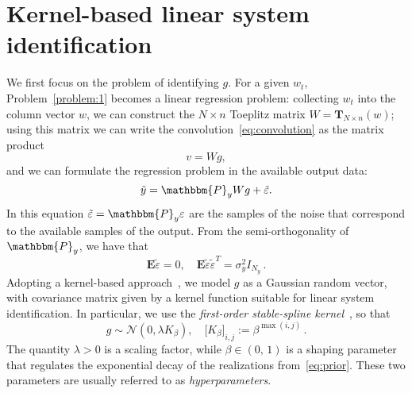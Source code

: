\documentclass[10pt]{article}
\renewcommand{\P}{\mathbbm{P}}
\newcommand{\T}{\mathbf{T}}
\newcommand{\E}{\mathbf{E}}
\begin{document}
\section{Kernel-based linear system identification}\label{sec:sysid}
We first focus on the problem of identifying $g$. For a given $w_t$,
Problem~\ref{problem:1} becomes a linear regression problem: collecting
$w_t$ into the column vector $w$, we can construct the $N\times n$
Toeplitz matrix $W = \T_{N\times n}(w)$; using this matrix we can write the
convolution~\eqref{eq:convolution} as the matrix product
\begin{equation}
  v = Wg,
\end{equation}
and we can formulate the regression problem in the available output data:
\begin{equation}\label{eq:regression}
  \tilde y = \P_y Wg + \tilde \varepsilon.
\end{equation}
In this equation $\tilde \varepsilon = \P_y\varepsilon$ are the samples of the
noise that correspond to the available samples of the output. From the
semi-orthogonality of $\P_y$, we have that
\begin{equation}
  \E \tilde \varepsilon =  0, \quad \E{\tilde \varepsilon \tilde \varepsilon^T}
  =
  \sigma_y^2 I_{N_y} \,.
\end{equation}
Adopting a kernel-based approach~\cite{pillonetto2014kernel}, we model $g$ as a
Gaussian random vector, with covariance matrix given by a kernel function
suitable for linear system identification. In particular, we use the
\emph{first-order stable-spline kernel}~\cite{pillonetto2010new}, so that
\begin{equation}\label{eq:prior}
  g \sim \mathcal{N}(0,\lambda K_\beta), \quad {\big[K_\beta\big]}_{i,j} := \beta^{ \max(i,j)} \,.
\end{equation}
The quantity $\lambda>0$ is a scaling factor, while $\beta\in(0,\,1)$ is a
shaping parameter that regulates the exponential decay of the realizations from~\eqref{eq:prior}. These two parameters are usually referred to as
\emph{hyperparameters}.
\end{document}
